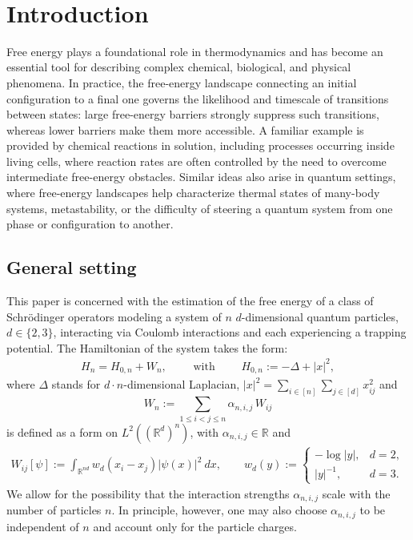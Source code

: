 \documentclass[11pt]{amsart}
\newcommand{\1}{\mathbbm{1}}
\newcommand{\R}{\mathbb{R}}
\theoremstyle{plain}
\theoremstyle{definition}
\theoremstyle{remark}
\numberwithin{equation}{section}
\begin{document}
\
\maketitle

\vspace{-1,2cm}



 \tableofcontents




\section{Introduction}


\noindent Free energy plays a foundational role in thermodynamics and has become an essential tool for describing complex chemical, biological, and physical phenomena.
In practice, the free-energy landscape connecting an initial configuration to a final one governs the likelihood and timescale of transitions between states: large free-energy barriers strongly suppress such transitions, whereas lower barriers make them more accessible. A familiar example is provided by chemical reactions in solution, including processes occurring inside living cells, where reaction rates are often controlled by the need to overcome intermediate free-energy obstacles. Similar ideas also arise in quantum settings, where free-energy landscapes help characterize thermal states of many-body systems, metastability, or the difficulty of steering a quantum system from one phase or configuration to another.



\subsection{General setting} This paper is concerned with the estimation of the free energy of a class of Schr\"{o}dinger operators modeling a system of $n$ $d$-dimensional quantum particles, $d\in\{2,3\}$, interacting via Coulomb interactions and each experiencing a trapping potential. The Hamiltonian of the system takes the form:
\begin{align*}
H_n=H_{0,n}+W_n,\qquad \text{ with }\qquad  H_{0,n}:=-\Delta+|x|^2,
\end{align*}
where $\Delta$ stands for $d\cdot n$-dimensional Laplacian, $|x|^2=\sum_{i\in[n]}\sum_{j\in [d]}x_{ij}^2$ and 
\[
W_n:=\sum_{1\le i<j\le n}\alpha_{n,i,j}\,W_{ij}\]
is defined as a form on $L^2((\mathbb{R}^d)^n)$, with $\alpha_{n,i,j}\in\R$   and 
\begin{align*}
W_{ij}[\psi]:=\int_{\R^{nd}}w_d(x_i-x_j)|\psi(x)|^2 \ dx,\qquad
w_d(y):=
\begin{cases}
-\log|y|, & d=2,\\[0.3em]
|y|^{-1}, & d=3.
\end{cases}
\end{align*}
We allow for the possibility that the interaction strengths \(\alpha_{n,i,j}\) scale with the number of particles \(n\). In principle, however, one may also choose \(\alpha_{n,i,j}\) to be independent of \(n\) and account only for the particle charges.
\end{document}
